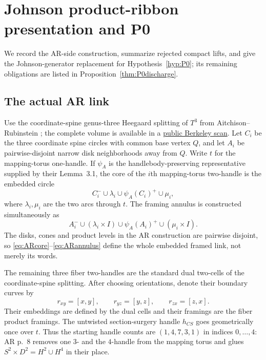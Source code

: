 \section{Johnson product-ribbon presentation and P0}\label{sec:johnson-presentation}

We record the AR-side construction, summarize rejected compact lifts, and
give the Johnson-generator replacement for Hypothesis~\ref{hyp:P0}; its
remaining obligations are listed in Proposition~\ref{thm:P0discharge}.

\subsection{The actual AR link}

Use the coordinate-spine genus-three Heegaard splitting of $T^3$ from
Aitchison--Rubinstein \cite[pp.~5--12]{AitchisonRubinstein1984}; the complete
volume is available in a
\href{https://math.berkeley.edu/~kirby/papers/Gordon%20and%20Kirby%20%28editors%29%20-%20Four-manifold%20theory%20%28Durham%29%20-%20MR0780574.pdf}
{public Berkeley scan}.  Let
$C_i$ be the three coordinate spine circles with common base vertex $Q$, and
let $A_i$ be pairwise-disjoint narrow disk neighborhoods away from $Q$.
Write $t$ for the mapping-torus one-handle.  If $\psi_A$ is the
handlebody-preserving representative supplied by their Lemma~3.1, the core
of the $i$th mapping-torus two-handle is the embedded circle
\begin{equation}\label{eq:ARcore}
C_i^-\cup\lambda_i\cup\psi_A(C_i)^+\cup\mu_i,
\end{equation}
where $\lambda_i,\mu_i$ are the two arcs through $t$.  The framing annulus is
constructed simultaneously as
\begin{equation}\label{eq:ARannulus}
A_i^-\cup(\lambda_i\times I)\cup\psi_A(A_i)^+
       \cup(\mu_i\times I).
\end{equation}
The disks, cones and product levels in the AR construction are pairwise
disjoint, so \eqref{eq:ARcore}--\eqref{eq:ARannulus} define the whole
embedded framed link, not merely its words.

The remaining three fiber two-handles are the standard dual two-cells of the
coordinate-spine splitting.  After choosing orientations, denote their
boundary curves by
\[
r_{xy}=[x,y],\qquad r_{yz}=[y,z],\qquad r_{zx}=[z,x].
\]
Their embeddings are defined by the dual cells and their framings are the
fiber product framings.  The untwisted section-surgery handle $h_{CS}$ goes
geometrically once over $t$.  Thus the starting handle counts are
$(1,4,7,3,1)$ in indices $0,\ldots,4$: AR p.~8 removes one $3$- and the
$4$-handle from the mapping torus and glues
$S^2\times D^2=H^2\cup H^4$ in their place.

